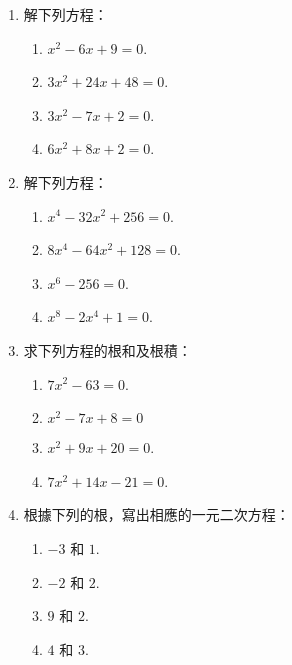 \documentclass[12pt]{article}
\begin{document}
    \begin{enumerate}
        \item 解下列方程：\begin{enumerate}
            \item $x^2-6x+9=0$.
            \item $3x^2+24x+48=0$.
            \item $3x^2-7x+2=0$.
            \item $6x^2+8x+2=0$.
        \end{enumerate}
        \item 解下列方程：\begin{enumerate}
            \item $x^4-32x^2+256=0$.
            \item $8x^4-64x^2+128=0$.
            \item $x^6-256=0$.
            \item $x^8-2x^4+1=0$.
        \end{enumerate}
        \item 求下列方程的根和及根積：\begin{enumerate}
            \item $7x^2-63=0$.
            \item $x^2-7x+8=0$
            \item $x^2+9x+20=0$.
            \item $7x^2+14x-21=0$.
        \end{enumerate}
        \item 根據下列的根，寫出相應的一元二次方程：\begin{enumerate}
            \item $-3$ 和 $1$.
            \item $-2$ 和 $2$.
            \item $9$ 和 $2$.
            \item $4$ 和 $3$.
        \end{enumerate}
    \end{enumerate}
\end{document}
